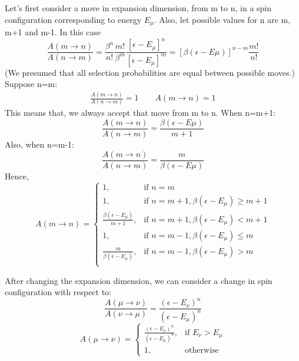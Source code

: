 \documentclass[12pt,fleqn]{report}
\begin{document}
Let's first consider a move in expansion dimension, from m to n, in a spin 
configuration corresponding to energy $E_\mu$. Also, let possible values 
for n are m, m+1 and m-1. In this 
case 
\begin{equation}
\frac{A(m \rightarrow n)}{A(n \rightarrow m)} = 
\frac{\beta^n}{n!}\frac{m!}{\beta^m}\frac{[\epsilon - E_\mu]^n}{[\epsilon - 
E_\mu]^m}=[\beta (\epsilon - E\mu )]^{n-m} \frac{m!}{n! }
\end{equation}
(We presumed that all selection probabilities are equal between possible 
moves.)
Suppose n=m:
\begin{gather}
\frac{A(m \rightarrow n)}{A(n \rightarrow m)}  = 1  \qquad A(m \rightarrow 
n) = 1 
\end{gather}
This means that, we always accept that move from m to n. 
When n=m+1:
\begin{equation}
\frac{A(m \rightarrow n)}{A(n \rightarrow m)} = \frac{\beta (\epsilon - 
E\mu )}{m+1}
\end{equation} 
Also, when n=m-1:
\begin{equation}
\frac{A(m \rightarrow n)}{A(n \rightarrow m)} = \frac{m}{\beta (\epsilon - 
E\mu )}
\end{equation}
Hence,
\[
    A(m \rightarrow n)= 
\begin{cases}
   1 ,& \text{if } n=m\\
    1,              & \text{if } n=m+1 , \beta (\epsilon - E_\mu) \geq m+1\\
    \frac{\beta (\epsilon - E_\mu)}{m+1},  & \text{if } n = m+1 ,  \beta 
    (\epsilon - E_\mu) < m+1 \\
    1, & \text{if } n = m-1 ,  \beta (\epsilon - E_\mu) \leq m \\
    \frac{m}{\beta (\epsilon - E_\mu)}, & \text{if } n = m-1 ,  \beta (\epsilon 
    - E_\mu) > m \\
    
\end{cases}
\]

After changing the expansion dimension, we can consider a change in spin 
configuration with respect to:
\begin{equation}
\frac{A(\mu \rightarrow \nu)}{A(\nu \rightarrow \mu)} = \frac{(\epsilon - 
E_\nu)^n}{(\epsilon - E_\mu)^n}
\end{equation}
\[
    A(\mu \rightarrow \nu)= 
\begin{cases}
   \frac{(\epsilon - E_\nu)^n}{(\epsilon - E_\mu)^n} ,& \text{if } E_\nu > 
   E_\mu\\
    1,              & \text{otherwise}
\end{cases}
\]
\end{document}
